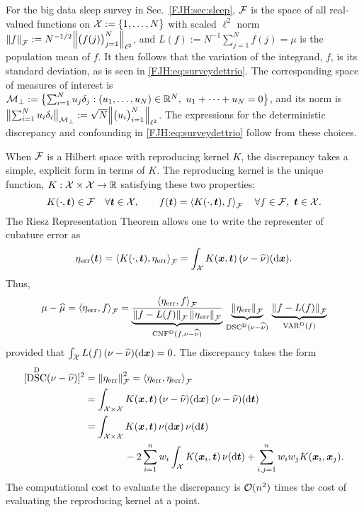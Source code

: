 \documentclass[graybox,footinfo]{svmult}
\DeclareMathOperator{\algn}{CNF}
\DeclareMathOperator{\disc}{DSC}
\DeclareMathOperator{\Var}{VAR}
\begin{document}
For the big data sleep survey in Sec.\ \ref{FJH:sec:sleep}, $\cf$ is the space of all 
real-valued functions on $\cx := \{1, \ldots, N\}$ with scaled $\ell^2$ norm 
$\norm{f}_{\cf} 
:= N^{-1/2} \Bignorm{\bigl(f(j)\bigr)_{j=1}^N}_{\ell^2}$, and $L(f) := N^{-1}\sum_{j=1}^N f(j) 
= 
\mu $ is the population mean of $f$. It then follows that the variation of 
the integrand, $f$, is its standard deviation, as is seen in \eqref{FJH:eq:surveydettrio}.
The corresponding space of measures of interest is $\cm_\bot := \bigl \{ \sum_{i=1}^N u_j 
\delta_{j} : (u_1, \ldots, u_N) \in \R^N,\ u_1 + \cdots + u_N= 0 \bigr \}$, and its norm is 
$\bignorm{\sum_{i=1}^N u_i \delta_{i}}_{\cm_\bot} : = 
	\sqrt{N} \Bignorm{\bigl(u_i\bigr)_{i=1}^N}_{\ell^2}$.   The expressions for the 
	deterministic 
	discrepancy and confounding in \eqref{FJH:eq:surveydettrio} follow from these 
	choices.

When $\cf$ is a Hilbert space with reproducing kernel $K$, the discrepancy takes a 
simple, explicit form in terms of $K$.  The reproducing kernel is the unique function, $K: 
\cx \times \cx \to \R$ satisfying these two properties:
\begin{equation}
K(\cdot,\bst) \in \cf \quad \forall \bst \in \cx, \qquad f(\bst) = \ip[\cf]{K(\cdot,\bst)}{f} 
\quad \forall f \in \cf, \ \bst \in \cx.
\end{equation}
The Riesz Representation Theorem allows one to write the representer of cubature error 
as 
\begin{equation}
\eta_{\err}(\bst) = \ip[\cf]{K(\cdot,\bst)}{\eta_{\err}} = \int_{\cx} K(\bsx,\bst) \, (\nu - 
\hnu)(\D\bsx).
\end{equation}
Thus, 
\begin{equation}
\mu - \widehat{\mu} =  \ip[\cf]{\eta_{\err}}{f} = 
\underbrace{\frac{\ip[\cf]{\eta_{\err}}{f}}{\norm{f - 
L(f)}_{\cf} \norm{\eta_{\err}}_{\cf}} }_{\algn^\Dt(f,\nu - \hnu)}\, 
\underbrace{\norm{\eta_{\err}}_{\cf}}_{\disc^{\Dt}(\nu - \hnu)} \, 
\underbrace{\norm{f - L(f)}_{\cf}}_{\Var^\Dt(f)}
\end{equation}
provided that $\int_{\cx} L(f) \, (\nu - \hnu)(\D \bsx) = 0$.  The discrepancy  takes the 
form \cite{Hic99a}
\begin{align}
\nonumber
[\disc^{\Dt}(\nu - \hnu)]^2 & = \norm{\eta_{\err}}_{\cf}^2 = \ip[\cf]{\eta_{\err}}{\eta_{\err}} 
\\
\nonumber
& = \int_{\cx \times \cx} K(\bsx,\bst) \, (\nu - \hnu)(\D \bsx) \, (\nu - \hnu)(\D \bst) \\
\nonumber
& = \int_{\cx \times \cx} K(\bsx,\bst) \, \nu(\D \bsx) \, \nu (\D \bst)  \\
& \qquad \qquad - 2 \sum_{i=1}^n w_i 
\int_{\cx} K(\bsx_i,\bst) \, \nu(\D \bst)+ \sum_{i,j = 1}^n w_iw_jK(\bsx_i,\bsx_j).
\end{align}
The computational cost to evaluate the discrepancy is $\Order(n^2)$ times the cost of 
evaluating the reproducing kernel at a point. 
\end{document}
